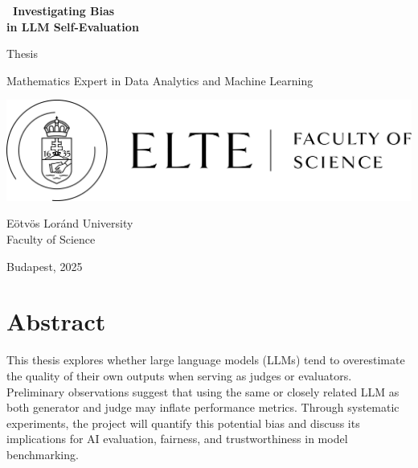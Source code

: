 \documentclass[noindent,nohyp,parspace,titlepage,twoside,12pt]{article}
\title{\TITLE}
\author{\AUTHOR}
\def\TITLE{\
  Investigating Bias \\
  in LLM Self-Evaluation\
}
\begin{document}
\begin{titlepage}

  \begin{center}
    \Huge\textbf{\TITLE}\normalsize
  \end{center}
  \begin{center}
    \Large Thesis \normalsize
  \end{center}

  \vfill


  \vfill

  \begin{center}
    \Large Mathematics Expert in Data Analytics and Machine Learning
    \normalsize
  \end{center}

  \begin{center}
    \includegraphics[scale=0.2]{img/logo.png} \\
  \end{center}

  \begin{center}
    \Large Eötvös Loránd University \\
    \Large Faculty of Science \normalsize
  \end{center}

  \begin{center}
    \Large Budapest, 2025 \normalsize
  \end{center}

\end{titlepage}

  \tableofcontents

\newpage

  \section*{Abstract}

    This thesis explores whether large language models (LLMs) tend to
    overestimate the quality of their own outputs when serving as judges or
    evaluators. Preliminary observations suggest that using the same or
    closely related LLM as both generator and judge may inflate performance
    metrics. Through systematic experiments, the project will quantify this
    potential bias and discuss its implications for AI evaluation, fairness,
    and trustworthiness in model benchmarking.
\end{document}

